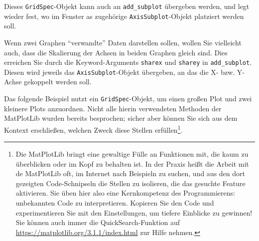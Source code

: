 Dieses \texttt{GridSpec}-Objekt kann auch an \texttt{add\_subplot} übergeben werden, und legt wieder fest, wo im Fenster as zugehörige \texttt{AxisSubplot}-Objekt platziert werden soll.

Wenn zwei Graphen \enquote{verwandte} Daten darstellen sollen, wollen Sie vielleicht auch, dass die Skalierung der Achsen in beiden Graphen gleich sind. Dies erreichen Sie durch die Keyword-Arguments \texttt{sharex} und \texttt{sharey} in \texttt{add\_subplot}. Diesen wird jeweils das \texttt{AxisSubplot}-Objekt übergeben, an das die X- bzw. Y-Achse gekoppelt werden soll.

Das folgende Beispiel nutzt ein \texttt{GridSpec}-Objekt, um einen großen Plot und zwei kleinere Plots anzuordnen. Nicht alle hierin verwendeten Methoden der MatPlotLib wurden bereits besprochen; sicher aber können Sie sich aus dem Kontext erschließen, welchen Zweck diese Stellen erfüllen\footnote{Die MatPlotLib bringt eine gewaltige Fülle an Funktionen mit, die kaum zu überblicken oder im Kopf zu behalten ist. In der Praxis heißt die Arbeit mit de MatPlotLib oft, im Internet nach Beispieln zu suchen, und aus den dort gezeigten Code-Schnipseln die Stellen zu isolieren, die das gesuchte Feature aktivieren. Sie üben hier also eine Kernkompetenz des Programmierens: unbekannten Code zu interpretieren. Kopieren Sie den Code und experimentieren Sie mit den Einstellungen, um tiefere Einblicke zu gewinnen! Sie können auch immer die QuickSearch-Funktion auf \url{https://matplotlib.org/3.1.1/index.html} zur Hilfe nehmen.}.

